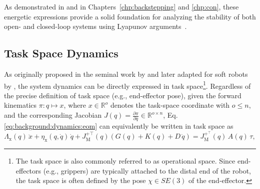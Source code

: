 As demonstrated in \citet{della2020model, della2023model} and in Chapters~\ref{chp:backstepping} and \ref{chp:con}, these energetic expressions provide a solid foundation for analyzing the stability of both open- and closed-loop systems using Lyapunov arguments~\citep{khalil2002nonlinear}.

\subsection{Task Space Dynamics}\label{sub:background:dynamics:task_space}
As originally proposed in the seminal work by \citet{khatib1987unified} and later adapted for soft robots by \citet{della2020model}, the system dynamics can be directly expressed in task space\footnote{The task space is also commonly referred to as operational space. Since end-effectors (e.g., grippers) are typically attached to the distal end of the robot, the task space is often defined by the pose $\chi \in SE(3)$ of the end-effector.}. Regardless of the precise definition of task space (e.g., end-effector pose), given the forward kinematics $\pi: q \mapsto x$, where $x \in \mathbb{R}^o$ denotes the task-space coordinate with $o \leq n$, and the corresponding Jacobian $J(q) = \frac{\partial \pi}{\partial q} \in \mathbb{R}^{o \times n}$, Eq.\ref{eq:background:dynamics:eom} can equivalently be written in task space as
\begin{equation}\label{eq:background:dynamics:eom_task_space}
    \Lambda_\mathrm{x}(q) \, \ddot{x} + \eta_\mathrm{x}(q, \dot{q}) \, \dot{q} + J_\mathrm{M}^{+\top}(q) \left ( G(q) + K(q) + D \, \dot{q} \right ) = J_\mathrm{M}^{+^\top}(q) \, A(q) \, \tau,
\end{equation}
